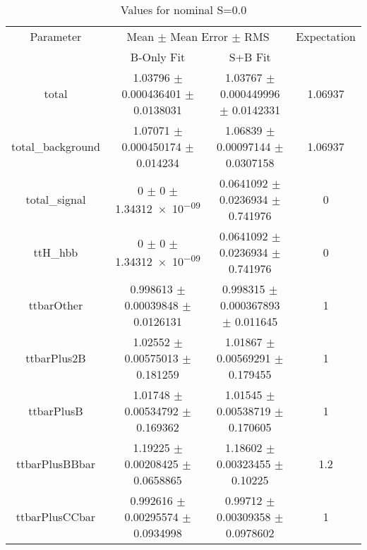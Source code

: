 \begin{table}
\centering
\caption{Values for nominal S=0.0}
\begin{tabular}{cccc}
\toprule
Parameter & \multicolumn{2}{c}{Mean $\pm$ Mean Error $\pm$ RMS} & Expectation\\
 & B-Only Fit & S+B Fit & \\
\midrule
total & \num{1.03796} $\pm$ \num{0.000436401} $\pm$ \num{0.0138031} & \num{1.03767} $\pm$ \num{0.000449996} $\pm$ \num{0.0142331} & \num{1.06937}\\
total\_background & \num{1.07071} $\pm$ \num{0.000450174} $\pm$ \num{0.014234} & \num{1.06839} $\pm$ \num{0.00097144} $\pm$ \num{0.0307158} & \num{1.06937}\\
total\_signal & \num{0} $\pm$ \num{0} $\pm$ \num{1.34312e-09} & \num{0.0641092} $\pm$ \num{0.0236934} $\pm$ \num{0.741976} & \num{0}\\
ttH\_hbb & \num{0} $\pm$ \num{0} $\pm$ \num{1.34312e-09} & \num{0.0641092} $\pm$ \num{0.0236934} $\pm$ \num{0.741976} & \num{0}\\
ttbarOther & \num{0.998613} $\pm$ \num{0.00039848} $\pm$ \num{0.0126131} & \num{0.998315} $\pm$ \num{0.000367893} $\pm$ \num{0.011645} & \num{1}\\
ttbarPlus2B & \num{1.02552} $\pm$ \num{0.00575013} $\pm$ \num{0.181259} & \num{1.01867} $\pm$ \num{0.00569291} $\pm$ \num{0.179455} & \num{1}\\
ttbarPlusB & \num{1.01748} $\pm$ \num{0.00534792} $\pm$ \num{0.169362} & \num{1.01545} $\pm$ \num{0.00538719} $\pm$ \num{0.170605} & \num{1}\\
ttbarPlusBBbar & \num{1.19225} $\pm$ \num{0.00208425} $\pm$ \num{0.0658865} & \num{1.18602} $\pm$ \num{0.00323455} $\pm$ \num{0.10225} & \num{1.2}\\
ttbarPlusCCbar & \num{0.992616} $\pm$ \num{0.00295574} $\pm$ \num{0.0934998} & \num{0.99712} $\pm$ \num{0.00309358} $\pm$ \num{0.0978602} & \num{1}\\
\bottomrule
\end{tabular}
\end{table}